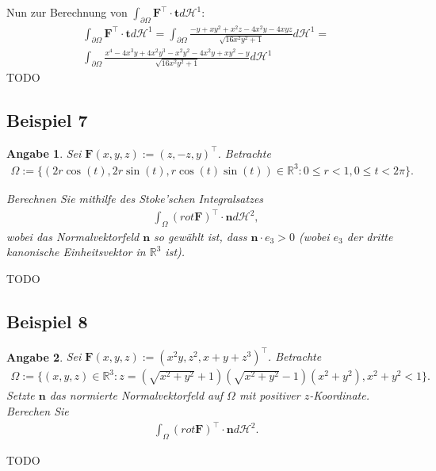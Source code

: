 \documentclass[]{article}
\newtheorem*{angabe*}{Angabe}
\begin{document}
Nun zur Berechnung von $\int_{\partial\Omega} \bm{F}^\top \cdot \bm{t} d\mathcal{H}^1$:
\begin{align*}
	\int_{\partial\Omega} \bm{F}^\top \cdot \bm{t} d\mathcal{H}^1 = \int_{\partial\Omega} \frac{-y + xy^2 + x^2z - 4x^2y - 4xyz}{\sqrt{16x^2y^2+1}} d\mathcal{H}^1 =\\
	\int_{\partial\Omega} \frac{x^4 - 4x^3y + 4x^2y^3 - x^2y^2 - 4x^2y + xy^2 - y}{\sqrt{16x^2y^2+1}} d\mathcal{H}^1
\end{align*}
TODO
\newpage
 
\subsection*{Beispiel 7}
\begin{angabe*}
	Sei $\bm{F}(x,y,z):=(z, -z, y)^\top$. Betrachte
	\begin{align*}
		\Omega := \{(2r\cos(t), 2r\sin(t), r\cos(t)\sin(t))\in \mathbb{R}^3: 0 \leq r < 1, 0 \leq t < 2\pi\}.
	\end{align*}
	
	Berechnen Sie mithilfe des Stoke'schen Integralsatzes
	\begin{align*}
		\int_\Omega (rot \bm{F})^\top \cdot \bm{n} d\mathcal{H}^2,
	\end{align*}
	wobei das Normalvektorfeld $\bm{n}$ so gewählt ist, dass $\bm{n}\cdot e_3 > 0$ (wobei $e_3$ der dritte kanonische Einheitsvektor in $\mathbb{R}^3$ ist).
\end{angabe*}
TODO

\subsection*{Beispiel 8}
\begin{angabe*}
	Sei $\bm{F}(x,y,z):=(x^2y, z^2, x+y+z^3)^\top$. Betrachte
	\begin{align*}
		\Omega := \{(x,y,z) \in \mathbb{R}^3: z=(\sqrt{x^2+y^2}+1)(\sqrt{x^2+y^2}-1)(x^2+y^2), x^2+y^2 < 1\}.
	\end{align*}
	Setzte $\bm{n}$ das normierte Normalvektorfeld auf $\Omega$ mit positiver $z$-Koordinate. Berechen Sie
	\begin{align*}
		\int_\Omega (rot \bm{F})^\top \cdot \bm{n} d\mathcal{H}^2.
	\end{align*}
\end{angabe*}
TODO
\end{document}
